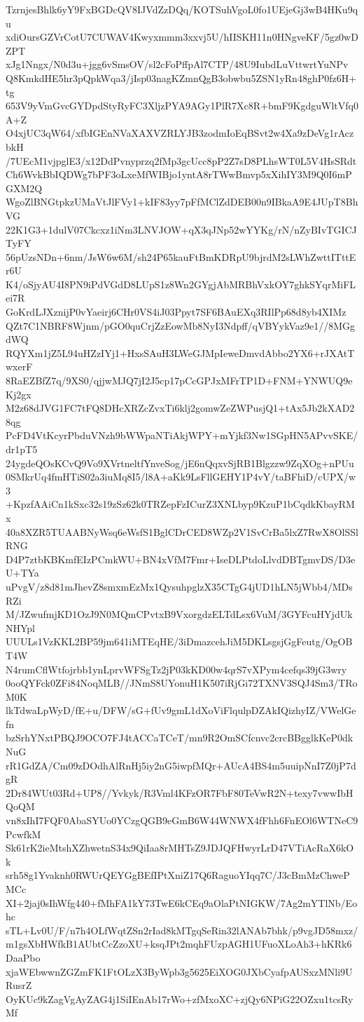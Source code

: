 TzrnjesBhlk6yY9FxBGDcQV8IJVdZzDQq/KOTSuhVgoL0fo1UEjeGj3wB4HKu9qu
xdiOursGZVrCotU7CUWAV4Kwyxmmm3xxvj5U/hIISKH11n0HNgveKF/5gz0wDZPT
xJg1Nngx/N0d3u+jgg6vSmsOV/sl2cFoPffpAl7CTP/48U9IubdLuVttwrtYuNPv
Q8KmkdHE5hr3pQpkWqa3/jIsp03nagKZmnQgB3obwbu5ZSN1yRn48ghP0fz6H+tg
653V9yVmGvcGYDpdStyRyFC3XljzPYA9AGy1PlR7Xc8R+bmF9KgdguWltVfq0A+Z
O4xjUC3qW64/xfbIGEnNVaXAXVZRLYJB3zodmIoEqBSvt2w4Xa9zDeVg1rAczbkH
/7UEcM1vjpglE3/x12DdPvnyprzq2fMp3gcUcc8pP2Z7sD8PLhsWT0L5V4HsSRdt
Ch6WvkBbIQDWg7bPF3oLxeMfWIBjo1yntA8rTWwBmvp5xXihIY3M9Q0I6mPGXM2Q
WgoZlBNGtpkzUMaVtJlFVy1+kIF83yy7pFfMClZdDEB00n9IBkaA9E4JUpT8BhVG
22K1G3+1dulV07Ckcxz1iNm3LNVJOW+qX3qJNp52wYYKg/rN/nZyBIvTGICJTyFY
56pUzsNDn+6nm/JsW6w6M/sh24P65kauFtBmKDRpU9bjrdM2sLWhZwttITttEr6U
K4/oSjyAU4I8PN9iPdVGdD8LUpS1z8Wn2GYgjAbMRBhVxkOY7ghkSYqrMiFLei7R
GoKrdLJXznijP0vYaeirj6CHr0VS4iJ03Ppyt7SF6BAuEXq3RIlPp68d8yb4XIMz
QZt7C1NBRF8Wjnm/pGO0quCrjZzEowMb8NyI3Ndpff/qVBYykVaz9e1//8MGgdWQ
RQYXm1jZ5L94uHZzIYj1+HxsSAuH3LWeGJMpIeweDmvdAbbo2YX6+rJXAtTwxerF
8RaEZBfZ7q/9XS0/qjjwMJQ7jI2J5cp17pCcGPJxMFrTP1D+FNM+YNWUQ9eKj2gx
M2z68dJVG1FC7tFQ8DHcXRZcZvxTi6klj2gomwZeZWPusjQ1+tAx5Jb2kXAD28qg
PcFD4VtKcyrPbduVNzh9bWWpaNTiAkjWPY+mYjkf3Nw1SGpHN5APvvSKE/dr1pT5
24ygdeQOsKCvQ9Vo9XVrtneltfYnveSog/jE6nQqxvSjRB1Blgzzw9ZqXOg+nPUu
0SMkrUq4fmHTiS02a3iuMq8I5/l8A+aKk9LsFllGEHY1P4vY/taBFhiD/cUPX/w3
+KpzfAAiCn1kSxc32s19zSz62k0TRZepFzICurZ3XNLbyp9KzuP1bCqdkKbayRMx
40a8XZR5TUAABNyWsq6eWsfS1BglCDrCED8WZp2V1SvCrBa5lxZ7RwX8OlSSlRNG
D4P7ztbKBKmfEIzPCmkWU+BN4xVfM7Fmr+IseDLPtdoLlvdDBTgmvDS/D3eU+TYa
uPvgV/z8d81mJhevZ8smxmEzMx1QysuhpglzX35CTgG4jUD1hLN5jWbb4/MDsRZi
M/JZwufmjKD1OzJ9N0MQmCPvtxB9VxorgdzELTdLsx6VuM/3GYFcuHYjdUkNHYpl
UUULs1VzKKL2BP59jm641iMTEqHE/3iDmazcehJiM5DKLsgsjGgFeutg/OgOBT4W
N4rumCflWtfojrbb1ynLprvWFSgTz2jP03kKD00w4qrS7vXPym4cefqs39jG3wry
0ooQYFck0ZFi84NoqMLB//JNmS8UYonuH1K507iRjGi72TXNV3SQJ4Sm3/TRoM0K
lkTdwaLpWyD/fE+u/DFW/sG+fUv9gmL1dXoViFlqulpDZAkIQizhyIZ/VWelGefn
bzSrhYNxtPBQJ9OCO7FJ4tACCaTCeT/mn9R2OmSCfcnvc2crcBBgglkKeP0dkNuG
rR1GdZA/Cm09zDOdhAlRnHj5iy2nG5iwpfMQr+AUcA4BS4m5uuipNnI7Z0jP7dgR
2Dr84WUt03Rd+UP8//Yvkyk/R3Vml4KFzOR7FbF80TeVwR2N+texy7vwwIbHQoQM
vn8xIhI7FQF0AbaSYUo0YCzgQGB9eGmB6W44WNWX4fFhh6FnEOl6WTNeC9PcwfkM
Sk61rK2ieMtshXZhwetnS34x9QiIaa8rMHTsZ9JDJQFHwyrLrD47VTiAcRaX6kOk
srh58g1Yvaknh0RWUrQEYGgBEfIPtXniZ17Q6RaguoYIqq7C/J3cBmMzChwePMCc
XI+2jaj0sIhWfg440+fMhFA1kY73TwE6kCEq9aOlaPtNIGKW/7Ag2mYTlNb/Eohc
sTL+Lv0U/F/n7h4OLfWqtZSn2rIad8kMTgqSeRin32lANAb7bhk/p9vgJD58mxz/
m1gsXbHWfkB1AUbtCcZzoXU+ksqJPt2mqhFUzpAGH1UFuoXLoAh3+hKRk6DaaPbo
xjaWEbwwnZGZmFK1FtOLzX3ByWpb3g5625EiXOG0JXbCyafpAUSxzMNli9URusrZ
OyKUc9kZagVgAyZAG4j1SiIEnAb17rWo+zfMxoXC+zjQy6NPiG22OZxu1tcsRyMf
